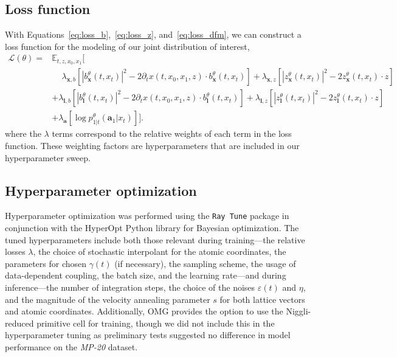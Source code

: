 \subsection{Loss function}
\label{app:loss}
With Equations~\ref{eq:loss_b},~\ref{eq:loss_z}, and~\ref{eq:loss_dfm}, we can construct a loss function for the modeling of our joint distribution of interest,
\begin{equation}
    \begin{split}
        \mathcal{L}(\theta) =
        &
        \mathbb{E}_{t, z, x_0, x_1} \big[ \\
        & \quad \, \lambda_{\bm{x}, b} \left[ |b_{\bm{x}}^\theta(t, x_t)|^2 - 2\partial_t x(t, x_0, x_1, z) \cdot b_{\bm{x}}^\theta(t, x_t) \right] +  \lambda_{\bm{x}, z} \left[ |z_{\bm{x}}^\theta(t, x_t)|^2 - 2z_{\bm{x}}^\theta(t, x_t) \cdot z \right] \\
        & + \lambda_{\bm{l}, b} \left[ |b_{\bm{l}}^\theta(t, x_t)|^2 - 2\partial_t x(t, x_0, x_1, z) \cdot b_{\bm{l}}^\theta(t, x_t) \right] + \lambda_{\bm{l}, z} \left[ |z_{\bm{l}}^\theta(t, x_t)|^2 - 2z_{\bm{l}}^\theta(t, x_t) \cdot z \right] \\
        & + \lambda_{\bm{a}} \left[ \log p_{1|t}^\theta(\bm{a}_1|x_{t}) \right]
        \big].
    \end{split}
\label{eq:loss_tot}
\end{equation}
where the $\lambda$ terms correspond to the relative weights of each term in the loss function. These weighting factors are hyperparameters that are included in our hyperparameter sweep.

\subsection{Hyperparameter optimization}
\label{app:hyperparameter}

Hyperparameter optimization was performed using the \texttt{Ray Tune} package \citep{liaw_tune_2018} in conjunction with the HyperOpt Python library \citep{bergstra_making_2013} for Bayesian optimization.
The tuned hyperparameters include both those relevant during training---the relative losses $\lambda$, the choice of stochastic interpolant for the atomic coordinates, the parameters for chosen $\gamma(t)$ (if necessary), the sampling scheme, the usage of data-dependent coupling, the batch size, and the learning rate---and during inference---the number of integration steps, the choice of the noises $\varepsilon(t)$ and $\eta$, and the magnitude of the velocity annealing parameter $s$ for both lattice vectors and atomic coordinates. 
Additionally, OMG provides the option to use the Niggli-reduced primitive cell \citep{grosse-kunstleve_numerically_2004, hjorthlarsen_atomic_2017} for training, though we did not include this in the hyperparameter tuning as preliminary tests suggested no difference in model performance on the \textit{MP-20} dataset.

